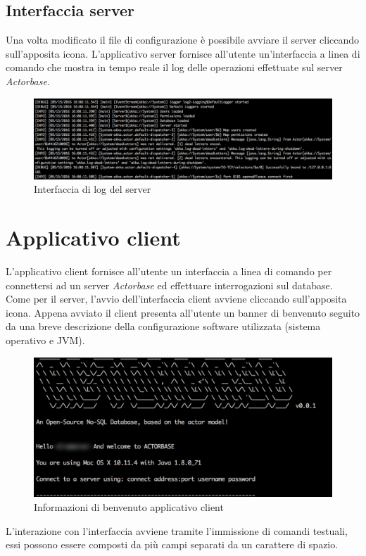 \documentclass[a4paper]{article}
\begin{document}
	\subsection{Interfaccia server}
	Una volta modificato il file di configurazione è possibile avviare il server cliccando sull'apposita icona. L'applicativo server fornisce all'utente un'interfaccia a linea di comando che mostra in tempo reale il log delle operazioni effettuate sul server \emph{Actorbase}.  
	\begin{figure}[H]
		\centering
		\includegraphics[width=\textwidth]{logServer.png}
		\caption{Interfaccia di log del server}
	\end{figure}
	\newpage
	

	\section{Applicativo client}
	L'applicativo client fornisce all'utente un interfaccia a linea di comando per connettersi ad un server \emph{Actorbase} ed effettuare interrogazioni sul database. Come per il server, l'avvio dell'interfaccia client avviene cliccando sull'apposita icona. Appena avviato il client presenta all'utente un banner di benvenuto seguito da una breve descrizione della configurazione software utilizzata (sistema operativo e JVM).
	\begin{figure}[H]
		\centering
		\includegraphics[width=\textwidth]{welcomeClient.png}
		\caption{Informazioni di benvenuto applicativo client}
	\end{figure}
	L'interazione con l'interfaccia avviene tramite l'immissione di comandi testuali, essi possono essere composti da più campi separati da un carattere di spazio.
	
\end{document}
